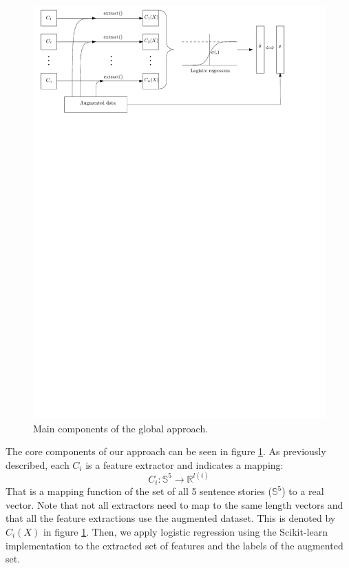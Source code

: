 \documentclass{article}
\begin{document}
	\begin{figure}[h!]
		\centering
		\includegraphics[scale=0.6]{fig/logistic_fitting.pdf}
		\caption{Main components of the global approach.}
		\label{Main}
	\end{figure}

The core components of our approach can be seen in figure \ref*{Main}. As
previously described, each $C_i$ is a feature extractor and indicates a mapping:
%
\begin{equation} C_i: \mathbb{S}^5 \rightarrow \mathbb{R}^{l(i)} \end{equation}
%
That is a mapping function of the set of all 5 sentence stories ($\mathbb{S}^5$)
to a real vector. Note that not all extractors need to map to the same length
vectors and that all the feature extractions use the augmented dataset. This is
denoted by $C_i(X)$ in figure \ref*{Main}. Then, we apply logistic regression
using the Scikit-learn implementation \cite{SKL} to the extracted set of
features and the labels of the augmented set.
\end{document}
